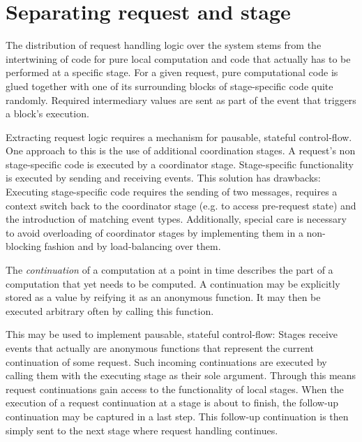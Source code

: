 \documentclass{sig-alternate}
\begin{document}
\section{Separating request and stage}

The distribution of request handling logic over the system stems from the intertwining of code for
pure local computation and code that actually has to be performed at a specific stage. For a given
request, pure computational code is glued together with one of its surrounding blocks of
stage-specific code quite randomly. Required intermediary values are sent as part of the event
that triggers a block's execution.


Extracting request logic requires a mechanism for pausable, stateful control-flow. One approach to
this is the use of additional coordination stages. A request's non stage-specific code is executed
by a coordinator stage. Stage-specific functionality is executed by sending and receiving events.
This solution has drawbacks: Executing stage-specific code requires the sending of two messages,
requires a context switch back to the coordinator stage (e.g. to access pre-request state) and the
introduction of matching event types. Additionally, special care is necessary to avoid overloading
of coordinator stages by implementing them in a non-blocking fashion and by load-balancing over
them.

The \emph{continuation} of a computation at a point in time describes the part of a computation that
yet needs to be computed. A continuation may be explicitly stored as a value by reifying it as an
anonymous function. It may then be executed arbitrary often by calling this function.

This may be used to implement pausable, stateful control-flow: Stages receive events that actually
are anonymous functions that represent the current continuation of some request. Such incoming
continuations are executed by calling them with the executing stage as their sole argument. Through
this means request continuations gain access to the functionality of local stages. When the
execution of a request continuation at a stage is about to finish, the follow-up continuation may be
captured in a last step. This follow-up continuation is then simply sent to the next stage where
request handling continues.
\end{document}
